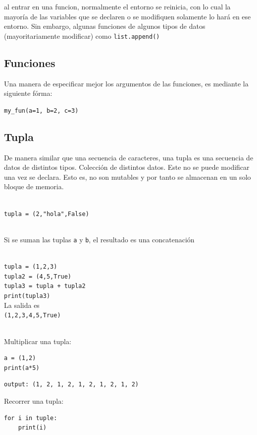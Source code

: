 al entrar en una funcion, normalmente el entorno se reinicia, con lo cual la mayoría de las variables que se declaren o se modifiquen solamente lo hará en ese entorno. Sin embargo, algunas funciones de algunos tipos de datos (mayoritariamente modificar) como \texttt{list.append()} 

\subsection{Funciones}

Una manera de especificar mejor los argumentos de las funciones, es mediante la siguiente fórma:

\texttt{my\_fun(a=1, b=2, c=3)}

\subsection{Tupla}

De manera similar que una secuencia de caracteres, una tupla es una secuencia de datos de distintos tipos. Colección de distintos datos. Este no se puede modificar una vez se declara. Esto es, no son mutables y por tanto se almacenan en un solo bloque de memoria.\\\

\texttt{tupla = (2,"hola",False)} \\\

Si se suman las tuplas \texttt{a} y \texttt{b}, el resultado es una concatenación \\\

\texttt{tupla = (1,2,3)} \\
\texttt{tupla2 = (4,5,True)} \\
\texttt{tupla3 = tupla + tupla2} \\
\texttt{print(tupla3)} \\
La salida es\\
\texttt{(1,2,3,4,5,True)}\\\

Multiplicar una tupla:

\begin{verbatim}
a = (1,2)
print(a*5)
\end{verbatim}
\begin{lstlisting}
output: (1, 2, 1, 2, 1, 2, 1, 2, 1, 2)
\end{lstlisting}

Recorrer una tupla:
\begin{verbatim}
for i in tuple:
    print(i)
\end{verbatim}

